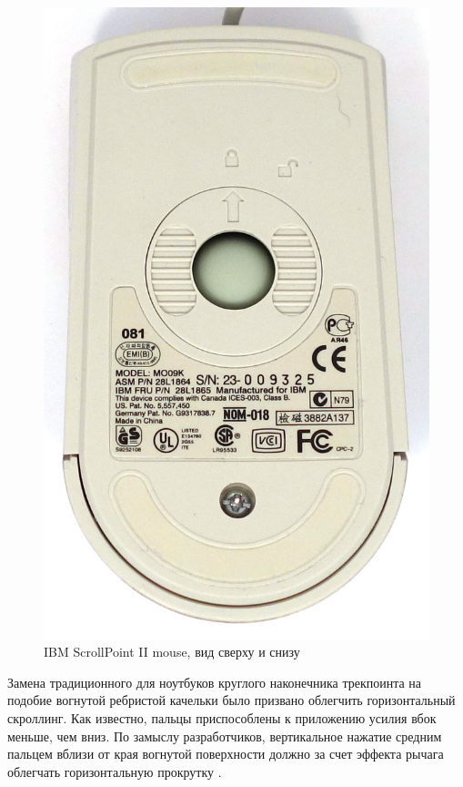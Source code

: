 \documentclass[11pt, a4paper]{article}
\begin{document}
\begin{figure}[h]
    \includegraphics[scale=0.7]{2000_ibm_scrollpoint_ii_mouse/bottom_30.jpg}
    \caption{IBM ScrollPoint II mouse, вид сверху и снизу}
    \label{fig:IBMScrollPointIITopBottom}
\end{figure}

Замена традиционного для ноутбуков круглого наконечника трекпоинта на подобие вогнутой ребристой качельки было призвано облегчить горизонтальный скроллинг. Как известно, пальцы приспособлены к приложению усилия вбок меньше, чем вниз. По замыслу разработчиков, вертикальное нажатие средним пальцем вблизи от края вогнутой поверхности должно за счет эффекта рычага облегчать горизонтальную прокрутку \cite{buxtonG2}.
\end{document}
